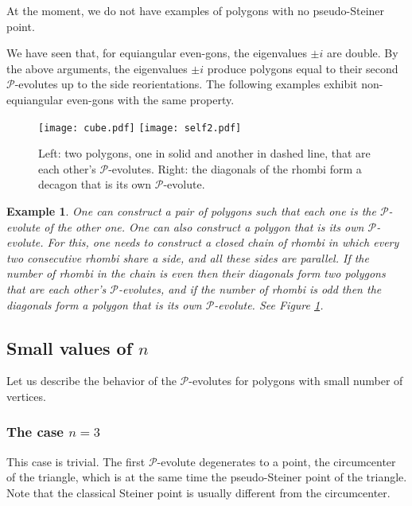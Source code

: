 \documentclass[12pt]{article}
\newtheorem{example}[lemma]{Example}
\newcommand{\Pev}{\mathcal{P}}
\begin{document}
At the moment, we do not have examples of polygons with no pseudo-Steiner point.

We have seen that, for equiangular even-gons, the eigenvalues $\pm i$ are double. By the above arguments, the eigenvalues $\pm i$ produce polygons equal to their second $\Pev$-evolutes up to the side reorientations. The following examples exhibit non-equiangular even-gons with the same property. 

\begin{figure}[hbtp]
\centering
\texttt{[image: cube.pdf]} \hspace{0.2 \textwidth}
\texttt{[image: self2.pdf]}
\caption{Left: two polygons, one in solid and another in dashed line, that are each other's $\Pev$-evolutes. Right: the diagonals of the rhombi form a decagon that is its own $\Pev$-evolute.}
\label{self}
\end{figure}

\begin{example}
\label{pairs}
{\rm One can construct a pair of polygons such that each one is the $\Pev$-evolute of the other one. One can also construct a polygon that is its own $\Pev$-evolute. For this, one needs to construct a closed chain of rhombi in which every two consecutive rhombi share a side, and all these sides are parallel. If the number of rhombi in the chain is even then their diagonals form two polygons that are each other's $\Pev$-evolutes, and if the number of rhombi is odd then the diagonals form a polygon that is its own $\Pev$-evolute. See Figure \ref{self}.}
\end{example}

\subsection{Small values of $n$}
\label{small}

Let us describe the behavior of the $\Pev$-evolutes for  polygons with small number of vertices.

\subsubsection{The case $n=3$}\label{small3}  This case is trivial. The first $\Pev$-evolute degenerates to a point, the circumcenter of the triangle, which is at the same time the pseudo-Steiner point of the triangle. Note that the classical Steiner point is usually different from the circumcenter.
\end{document}
